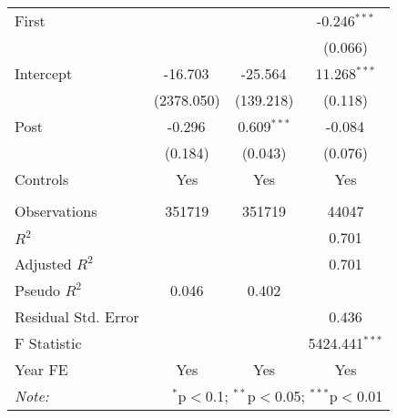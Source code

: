 \begin{tabular}{@{\extracolsep{5pt}}lccc}
    First                &                                                                      &                & -0.246$^{***}$   \\
                         &                                                                      &                & (0.066)          \\
    Intercept            & -16.703$^{}$                                                         & -25.564$^{}$   & 11.268$^{***}$   \\
                         & (2378.050)                                                           & (139.218)      & (0.118)          \\
    Post                 & -0.296$^{}$                                                          & 0.609$^{***}$  & -0.084$^{}$      \\
                         & (0.184)                                                              & (0.043)        & (0.076)          \\
    Controls             & Yes                                                                  & Yes            & Yes              \\
    \hline                                                                                                                          \\[-1.8ex]
    Observations         & 351719                                                               & 351719         & 44047            \\
    $R^2$                &                                                                      &                & 0.701            \\
    Adjusted $R^2$       &                                                                      &                & 0.701            \\
    Pseudo $R^2$         & 0.046                                                                & 0.402          &                  \\
    Residual Std. Error  &                                                                      &                & 0.436            \\
    F Statistic          &                                                                      &                & 5424.441$^{***}$ \\
    Year FE              & Yes                                                                  & Yes            & Yes              \\
    \hline
    \hline
    \textit{Note:}       & \multicolumn{3}{r}{$^{*}$p$<$0.1; $^{**}$p$<$0.05; $^{***}$p$<$0.01}                                     \\
\end{tabular}
